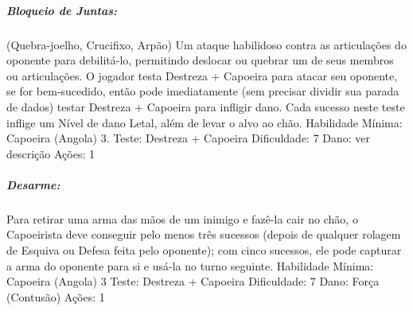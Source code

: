 \subparagraph{\bf Bloqueio de Juntas:}
(Quebra-joelho, Crucifixo, Arpão) Um ataque habilidoso contra as articulações do oponente para debilitá-lo, permitindo deslocar ou quebrar um de seus membros ou articulações. O jogador testa Destreza + Capoeira para atacar seu oponente, se for bem-sucedido, então pode imediatamente (sem precisar dividir sua parada de dados) testar Destreza + Capoeira para infligir dano. Cada sucesso neste teste inflige um Nível de dano Letal, além de levar o alvo ao chão. 
	Habilidade Mínima: Capoeira (Angola) 3. 
	Teste: Destreza + Capoeira
    Dificuldade: 7
    Dano: ver descrição
    Ações: 1

\subparagraph{\bf Desarme:}
Para retirar uma arma das mãos de um inimigo e fazê-la cair no chão, o Capoeirista deve conseguir pelo menos três sucessos (depois de qualquer rolagem de Esquiva ou Defesa feita pelo oponente); com cinco sucessos, ele pode capturar a arma do oponente para si e usá-la no turno seguinte.
	Habilidade Mínima: Capoeira (Angola) 3
    Teste: Destreza + Capoeira
    Dificuldade: 7
    Dano: Força (Contusão)
    Ações: 1